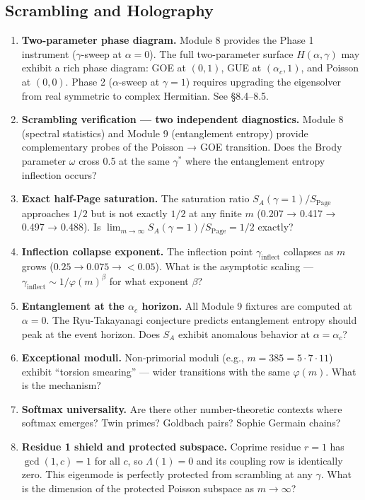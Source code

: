 \documentclass[
  11pt,
]{article}
\numberwithin{equation}{section}
\begin{document}
\subsection{Scrambling and
Holography}\label{scrambling-and-holography}

\begin{enumerate}
\def\labelenumi{\arabic{enumi}.}
\setcounter{enumi}{9}
\item
  \textbf{Two-parameter phase diagram.} Module 8 provides the Phase 1
  instrument (\(\gamma\)-sweep at \(\alpha = 0\)). The full
  two-parameter surface \(H(\alpha, \gamma)\) may exhibit a rich phase
  diagram: GOE at \((0, 1)\), GUE at \((\alpha_c, 1)\), and Poisson at
  \((0, 0)\). Phase 2 (\(\alpha\)-sweep at \(\gamma = 1\)) requires
  upgrading the eigensolver from real symmetric to complex Hermitian.
  See §8.4--8.5.
\item
  \textbf{Scrambling verification --- two independent diagnostics.}
  Module 8 (spectral statistics) and Module 9 (entanglement entropy)
  provide complementary probes of the Poisson → GOE transition. Does the
  Brody parameter \(\omega\) cross 0.5 at the same \(\gamma^*\) where
  the entanglement entropy inflection occurs?
\item
  \textbf{Exact half-Page saturation.} The saturation ratio
  \(S_A(\gamma=1)/S_{\text{Page}}\) approaches \(1/2\) but is not
  exactly \(1/2\) at any finite \(m\) (0.207 → 0.417 → 0.497 → 0.488).
  Is \(\lim_{m\to\infty} S_A(\gamma=1)/S_{\text{Page}} = 1/2\) exactly?
\item
  \textbf{Inflection collapse exponent.} The inflection point
  \(\gamma_{\text{inflect}}\) collapses as \(m\) grows
  (\(0.25 \to 0.075 \to {<}0.05\)). What is the asymptotic scaling ---
  \(\gamma_{\text{inflect}} \sim 1/\varphi(m)^{\beta}\) for what
  exponent \(\beta\)?
\item
  \textbf{Entanglement at the \(\alpha_c\) horizon.} All Module 9
  fixtures are computed at \(\alpha = 0\). The Ryu-Takayanagi conjecture
  predicts entanglement entropy should peak at the event horizon. Does
  \(S_A\) exhibit anomalous behavior at \(\alpha = \alpha_c\)?
\item
  \textbf{Exceptional moduli.} Non-primorial moduli (e.g.,
  \(m = 385 = 5 \cdot 7 \cdot 11\)) exhibit ``torsion smearing'' ---
  wider transitions with the same \(\varphi(m)\). What is the mechanism?
\item
  \textbf{Softmax universality.} Are there other number-theoretic
  contexts where softmax emerges? Twin primes? Goldbach pairs? Sophie
  Germain chains?
\item
  \textbf{Residue 1 shield and protected subspace.} Coprime residue
  \(r = 1\) has \(\gcd(1, c) = 1\) for all \(c\), so \(\Lambda(1) = 0\)
  and its coupling row is identically zero. This eigenmode is perfectly
  protected from scrambling at any \(\gamma\). What is the dimension of
  the protected Poisson subspace as \(m \to \infty\)?
\end{enumerate}
\end{document}
